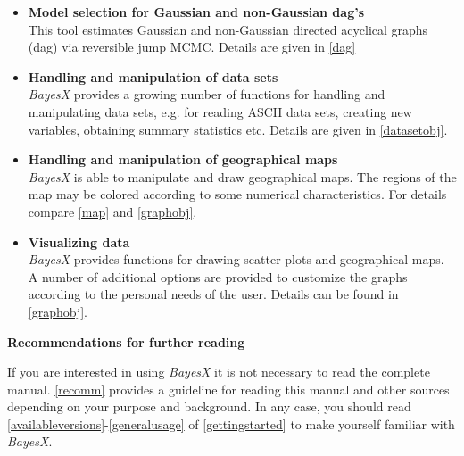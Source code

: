 \begin{itemize}
\item {\bf Model selection for Gaussian and non-Gaussian dag's} \\
This tool estimates Gaussian and non-Gaussian directed acyclical
graphs (dag) via reversible jump MCMC. Details are given in
\autoref{dag}
\item {\bf Handling and manipulation of data sets} \\
{\em BayesX} provides a growing number of functions for handling
and manipulating data sets, e.g. for reading ASCII data sets,
creating new variables, obtaining summary statistics etc. Details
are given in \autoref{datasetobj}.
\item {\bf Handling and manipulation of geographical maps} \\
{\em BayesX} is able to manipulate and draw geographical maps. The
regions of the map may be colored according to some numerical
characteristics. For details compare \autoref{map} and
\autoref{graphobj}.
\item {\bf Visualizing data} \\
{\em BayesX} provides functions for drawing scatter plots and
geographical maps. A number of additional options are provided to
customize the graphs according to the personal needs of the user.
Details can be found in \autoref{graphobj}.
\end{itemize}

\vspace{0.5cm} {\bf Recommendations for further reading}

\vspace{0.2cm} If you are interested in using {\em BayesX} it is
not necessary to read the complete manual. \autoref{recomm}
provides a guideline for reading this manual and other sources
depending on your purpose and background. In any case, you should
read \autoref{availableversions}-\autoref{generalusage} of
\autoref{gettingstarted} to make yourself familiar with {\em
BayesX}.



